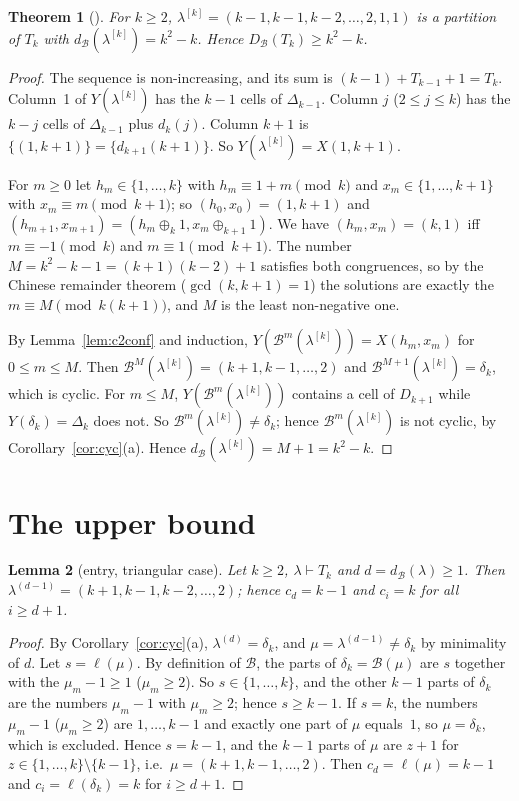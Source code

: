 \documentclass[11pt]{article}
\newtheorem{theorem}{Theorem}[section]
\newtheorem{lemma}[theorem]{Lemma}
\theoremstyle{definition}
\newcommand{\B}{\mathcal{B}}
\newcommand{\dB}{d_{\mathcal{B}}}
\newcommand{\DB}{D_{\mathcal{B}}}
\renewcommand{\le}{\leqslant}
\renewcommand{\ge}{\geqslant}
\begin{document}
\begin{theorem}[{\cite[Thm.~3.1]{GH}}]\label{thm:c2lower}
For $k\ge2$, $\lambda^{[k]}=(k-1,k-1,k-2,\dots,2,1,1)$ is a partition of $T_k$ with $\dB(\lambda^{[k]})=k^2-k$.
Hence $\DB(T_k)\ge k^2-k$.
\end{theorem}
\begin{proof}
The sequence is non-increasing, and its sum is $(k-1)+T_{k-1}+1=T_k$.  Column~1 of $Y(\lambda^{[k]})$ has the
$k-1$ cells of $\Delta_{k-1}$.  Column $j$ ($2\le j\le k$) has the $k-j$ cells of $\Delta_{k-1}$ plus $d_k(j)$.
Column $k+1$ is $\{(1,k+1)\}=\{d_{k+1}(k+1)\}$.  So $Y(\lambda^{[k]})=X(1,k+1)$.

For $m\ge0$ let $h_m\in\{1,\dots,k\}$ with $h_m\equiv 1+m\pmod k$ and $x_m\in\{1,\dots,k+1\}$ with
$x_m\equiv m\pmod{k+1}$; so $(h_0,x_0)=(1,k+1)$ and $(h_{m+1},x_{m+1})=(h_m\oplus_k1,x_m\oplus_{k+1}1)$.
We have $(h_m,x_m)=(k,1)$ iff $m\equiv-1\pmod k$ and $m\equiv1\pmod{k+1}$.  The number
$M=k^2-k-1=(k+1)(k-2)+1$ satisfies both congruences, so by the Chinese remainder theorem ($\gcd(k,k+1)=1$)
the solutions are exactly the $m\equiv M\pmod{k(k+1)}$, and $M$ is the least non-negative one.

By Lemma~\ref{lem:c2conf} and induction, $Y(\B^m(\lambda^{[k]}))=X(h_m,x_m)$ for $0\le m\le M$.  Then
$\B^{M}(\lambda^{[k]})=(k+1,k-1,\dots,2)$ and $\B^{M+1}(\lambda^{[k]})=\delta_k$, which is cyclic.  For
$m\le M$, $Y(\B^m(\lambda^{[k]}))$ contains a cell of $D_{k+1}$ while $Y(\delta_k)=\Delta_k$ does not.  So
$\B^m(\lambda^{[k]})\ne\delta_k$; hence $\B^m(\lambda^{[k]})$ is not cyclic, by Corollary~\ref{cor:cyc}(a).  Hence
$\dB(\lambda^{[k]})=M+1=k^2-k$.
\end{proof}

\section{The upper bound}\label{sec:c2upper}

\begin{lemma}[entry, triangular case]\label{lem:c2entry}
Let $k\ge2$, $\lambda\vdash T_k$ and $d=\dB(\lambda)\ge1$.  Then $\lambda^{(d-1)}=(k+1,k-1,k-2,\dots,2)$; hence
$c_d=k-1$ and $c_i=k$ for all $i\ge d+1$.
\end{lemma}
\begin{proof}
By Corollary~\ref{cor:cyc}(a), $\lambda^{(d)}=\delta_k$, and $\mu=\lambda^{(d-1)}\ne\delta_k$ by minimality of $d$.  Let
$s=\ell(\mu)$.  By definition of $\B$, the parts of $\delta_k=\B(\mu)$ are $s$ together with the
$\mu_m-1\ge1$ ($\mu_m\ge2$).  So $s\in\{1,\dots,k\}$, and the other $k-1$ parts of $\delta_k$ are the numbers
$\mu_m-1$ with $\mu_m\ge2$; hence $s\ge k-1$.  If $s=k$, the numbers $\mu_m-1$ ($\mu_m\ge2$) are
$1,\dots,k-1$ and exactly one part of $\mu$ equals~$1$, so $\mu=\delta_k$, which is excluded.  Hence
$s=k-1$, and the $k-1$ parts of $\mu$ are $z+1$ for $z\in\{1,\dots,k\}\setminus\{k-1\}$, i.e.\
$\mu=(k+1,k-1,\dots,2)$.  Then $c_d=\ell(\mu)=k-1$ and $c_i=\ell(\delta_k)=k$ for $i\ge d+1$.
\end{proof}
\end{document}
